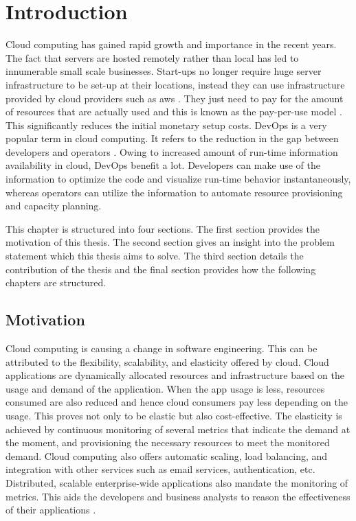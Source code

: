 \documentclass[article,type=msc,colorback,12pt,accentcolor=tud8b,table]{tudthesis}
\begin{document}
\clearpage

\setlength{ \parskip }{1em}
\tableofcontents 
\cleardoublepage 
\listoffigures
\cleardoublepage 
\listoftables
\clearpage
\cleardoublepage 


\hfill
 \section{Introduction}
	 \hfill \break
	
		Cloud computing has gained rapid growth and importance in the recent years. The fact that servers are hosted remotely rather than local has led to innumerable small scale businesses. Start-ups no longer require huge server infrastructure to be set-up at their locations, instead they can use infrastructure provided by cloud providers such as \gls{aws} \cite{aws}. They just need to pay for the amount of resources that are actually used and this is known as the pay-per-use model \cite{armbrust2010view}. This significantly reduces the initial monetary setup costs. DevOps is a very popular term in cloud computing. It refers to the reduction in the gap between developers and operators \cite{httermann2012devops} . Owing to increased amount of run-time information availability in cloud, DevOps benefit a lot. Developers can make use of the information to optimize the code and visualize run-time behavior instantaneously, whereas operators can utilize the information to automate resource provisioning and capacity planning.
		
		
		\par This chapter is structured into four sections. The first section provides the motivation of this thesis. The second section gives an insight into the problem statement which this thesis aims to solve. The third section details the contribution of the thesis and the final section provides how the following chapters are structured.
	
	
	\subsection{Motivation}
	
	Cloud computing is causing a change in software engineering. This can be attributed to the flexibility, scalability, and elasticity offered by cloud. Cloud applications are dynamically allocated resources and infrastructure based on the usage and demand of the application. When the app usage is less, resources consumed are also reduced and hence cloud consumers pay less depending on the usage. This proves not only to be elastic but also cost-effective. The elasticity is achieved by continuous monitoring of several metrics that indicate the demand at the moment, and provisioning the necessary resources to meet the monitored demand. Cloud computing also offers automatic scaling, load balancing, and integration with other services such as email services, authentication, etc. Distributed, scalable enterprise-wide applications also mandate the monitoring of metrics. This aids the developers and business analysts to reason the effectiveness of their applications \cite{leitner2012application}.
	
\end{document}

